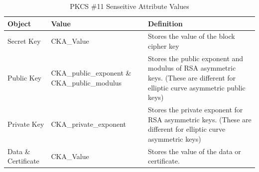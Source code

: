 \documentclass[bsc,frontabs,twoside,singlespacing,parskip,deptreport]{infthesis}     %
\begin{document}
\begin{table}[H]
\hskip-1.5cm\begin{tabular}{|p{3cm}|p{5cm}|p{10cm}|}
\hline
Object & Value & Definition\\
\hline
Secret Key & CKA\_Value & Stores the value of the block cipher key\\
\hline
Public Key & CKA\_public\_exponent \& CKA\_public\_modulus & Stores the public exponent and modulus of RSA asymmetric keys. (These are different for elliptic curve asymmetric public keys)\\
\hline
Private Key & CKA\_private\_exponent & Stores the private exponent for RSA asymmetric keys. (These are different for elliptic curve asymmetric keys)\\
\hline
Data \& Certificate & CKA\_Value & Stores the value of the data or certificate.\\
\hline
\end{tabular}
\caption{PKCS \#11 Senseitive Attribute Values}
\end{table}
\end{document}
